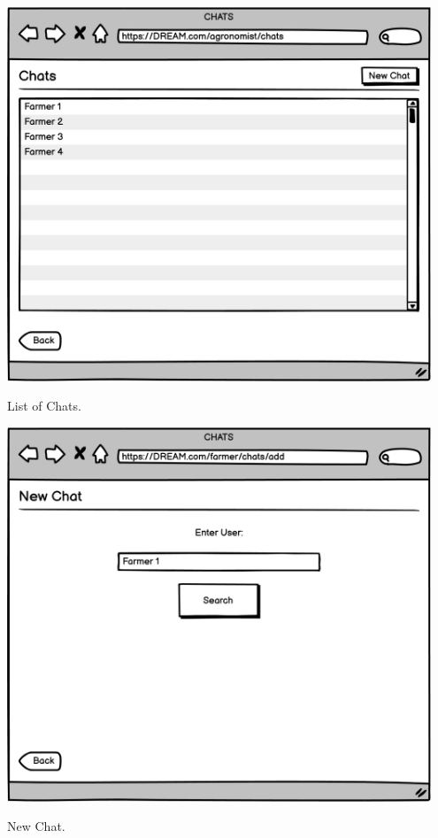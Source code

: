\vspace{0.5cm}
\begin{minipage}{.5\textwidth}
	\centering
	\includegraphics[width=0.95\textwidth]{Images/Mockup/Agronomist/15AgronomistChat.png}
	\captionsetup{type=figure}
	\caption{List of Chats.}
\end{minipage}%
\begin{minipage}{.5\textwidth}
	\centering
	\includegraphics[width=0.95\textwidth]{Images/Mockup/Agronomist/16AgronomistChatAdd.png}
	\captionsetup{type=figure}
	\caption{New Chat.}
\end{minipage}
